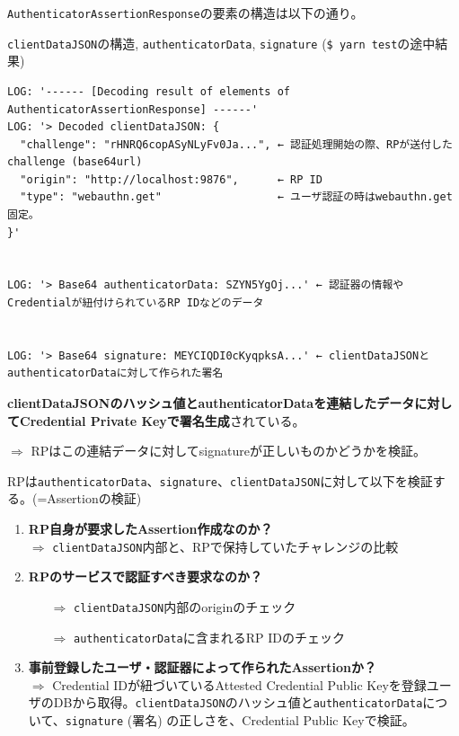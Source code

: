 \documentclass[12pt,dvipdfmx,uplatex]{beamer}
\begin{document}
\begin{frame}[fragile]
\small 

\texttt{AuthenticatorAssertionResponse}の要素の構造は以下の通り。

\begin{exampleblock}{\scriptsize \texttt{clientDataJSON}の構造, \texttt{authenticatorData}, \texttt{signature} (\texttt{\$ yarn test}の途中結果)}
\tiny
\begin{verbatim}
LOG: '------ [Decoding result of elements of AuthenticatorAssertionResponse] ------'
LOG: '> Decoded clientDataJSON: {
  "challenge": "rHNRQ6copASyNLyFv0Ja...", ← 認証処理開始の際、RPが送付したchallenge (base64url)
  "origin": "http://localhost:9876",      ← RP ID
  "type": "webauthn.get"                  ← ユーザ認証の時はwebauthn.get固定。
}'


LOG: '> Base64 authenticatorData: SZYN5YgOj...' ← 認証器の情報やCredentialが紐付けられているRP IDなどのデータ


LOG: '> Base64 signature: MEYCIQDI0cKyqpksA...' ← clientDataJSONとauthenticatorDataに対して作られた署名
\end{verbatim}
\end{exampleblock}
\textbf{clientDataJSONのハッシュ値とauthenticatorDataを連結したデータに対してCredential Private Keyで署名生成}されている。

\vspace{1ex}

$\Rightarrow$ RPはこの連結データに対してsignatureが正しいものかどうかを検証。
\end{frame}

\begin{frame}
\small
RPは\texttt{authenticatorData}、\texttt{signature}、\texttt{clientDataJSON}に対して以下を検証する。(=\alert{Assertionの検証})
\begin{enumerate}
 \item \textbf{RP自身が要求したAssertion作成なのか？}\\
$\Rightarrow$ \texttt{clientDataJSON}内部と、RPで保持していたチャレンジの比較
 \item \textbf{RPのサービスで認証すべき要求なのか？}\\
\begin{itemize}
 \item[$\Rightarrow$] \texttt{clientDataJSON}内部のoriginのチェック
 \item[$\Rightarrow$] \texttt{authenticatorData}に含まれるRP IDのチェック
\end{itemize}
 \item \textbf{事前登録したユーザ・認証器によって作られたAssertionか？}\\
$\Rightarrow$ Credential IDが紐づいているAttested Credential Public Keyを登録ユーザのDBから取得。\alert{\texttt{clientDataJSON}のハッシュ値と\texttt{authenticatorData}について、\texttt{signature} (署名) の正しさを、Credential Public Keyで検証。}
\end{enumerate}
\end{frame}
\end{document}
